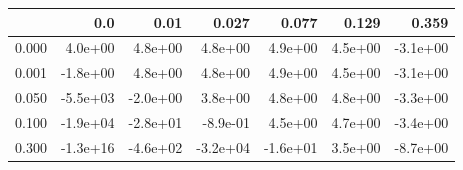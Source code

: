 \begin{tabular}{lrrrrrr}
\toprule
{} &      0.0 &     0.01 &    0.027 &    0.077 &   0.129 &    0.359 \\
\midrule
0.000 &  4.0e+00 &  4.8e+00 &  4.8e+00 &  4.9e+00 & 4.5e+00 & -3.1e+00 \\
0.001 & -1.8e+00 &  4.8e+00 &  4.8e+00 &  4.9e+00 & 4.5e+00 & -3.1e+00 \\
0.050 & -5.5e+03 & -2.0e+00 &  3.8e+00 &  4.8e+00 & 4.8e+00 & -3.3e+00 \\
0.100 & -1.9e+04 & -2.8e+01 & -8.9e-01 &  4.5e+00 & 4.7e+00 & -3.4e+00 \\
0.300 & -1.3e+16 & -4.6e+02 & -3.2e+04 & -1.6e+01 & 3.5e+00 & -8.7e+00 \\
\bottomrule
\end{tabular}
